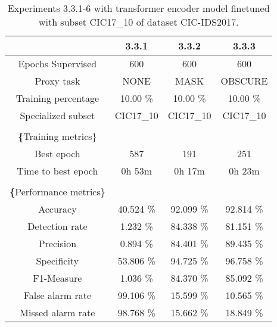 \begin{table}[htb]
    \centering
    \begin{tabular}{@{}cccc@{}}
        \toprule
         & 3.3.1 & 3.3.2 & 3.3.3 \\
        \midrule
        Epochs Supervised &  600 &  600 &  600 \\
        Proxy task &  NONE &  MASK &  OBSCURE \\
        Training percentage &  10.00 \% &  10.00 \% &  10.00 \% \\
        Specialized subset &  CIC17\_10 &  CIC17\_10 &  CIC17\_10 \\
         \\
        \textbf\{Training metrics\} &  &  &  \\
        Best epoch &  587 &  191 &  251 \\
        Time to best epoch &  0h 53m &  0h 17m &  0h 23m \\
         \\
        \textbf\{Performance metrics\} &  &  &  \\
        Accuracy &  40.524 \% &  92.099 \% &  92.814 \% \\
        Detection rate &  1.232 \% &  84.338 \% &  81.151 \% \\
        Precision &  0.894 \% &  84.401 \% &  89.435 \% \\
        Specificity &  53.806 \% &  94.725 \% &  96.758 \% \\
        F1-Measure &  1.036 \% &  84.370 \% &  85.092 \% \\
        False alarm rate &  99.106 \% &  15.599 \% &  10.565 \% \\
        Missed alarm rate &  98.768 \% &  15.662 \% &  18.849 \% \\
        \bottomrule
    \end{tabular}
    \caption{Experiments 3.3.1-6 with transformer encoder model finetuned with subset CIC17\_10 of dataset CIC-IDS2017.}
    \label{table:results:lstm:stats_flows_subset}
\end{table}